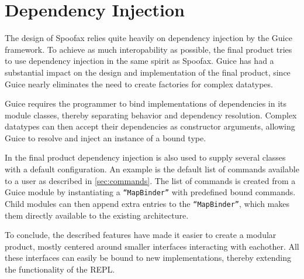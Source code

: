 \section{Dependency Injection}
\label{sec:injection}

The design of Spoofax relies quite heavily on dependency injection by the Guice
framework.  To achieve as much interopability as possible, the final product
tries to use dependency injection in the same spirit as Spoofax. Guice has had a
substantial impact on the design and implementation of the final product, since
Guice nearly eliminates the need to create factories for complex datatypes.

Guice requires the programmer to bind implementations of dependencies in its
module classes, thereby separating behavior and dependency resolution.  Complex
datatypes can then accept their dependencies as constructor arguments, allowing
Guice to resolve and inject an instance of a bound type.

In the final product dependency injection is also used to supply several classes
with a default configuration.  An example is the default list of commands
available to a user as described in \cref{sec:commands}.  The list of commands
is created from a Guice module by instantiating a \texttt{``MapBinder''} with
predefined bound commands. Child modules can then append extra entries to the
\texttt{``MapBinder''}, which makes them directly available to the existing
architecture.

To conclude, the described features have made it easier to create a modular
product, mostly centered around smaller interfaces interacting with eachother.
All these interfaces can easily be bound to new implementations, thereby
extending the functionality of the REPL.

